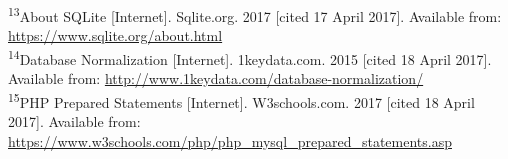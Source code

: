 \documentclass{article}
\begin{document}
\begin{flushleft}
\textsuperscript{13}About SQLite [Internet]. Sqlite.org. 2017 [cited 17 April 2017]. Available from: \url{https://www.sqlite.org/about.html}\\
\textsuperscript{14}Database Normalization [Internet]. 1keydata.com. 2015 [cited 18 April 2017]. Available from: \url{http://www.1keydata.com/database-normalization/}\\
\textsuperscript{15}PHP Prepared Statements [Internet]. W3schools.com. 2017 [cited 18 April 2017]. Available from: \url{https://www.w3schools.com/php/php_mysql_prepared_statements.asp}\\
\end{flushleft}
\end{document}
